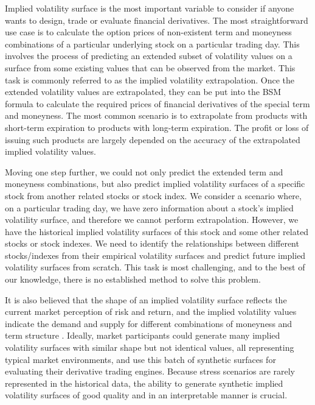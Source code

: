 \documentclass[format=sigconf]{acmart}
\begin{document}
Implied volatility surface is the most important variable to consider if anyone wants to design, trade or evaluate financial derivatives. 
%
The most straightforward use case is to calculate the option prices of non-existent term and moneyness combinations of a particular underlying stock \cite{homescu2011implied} on a particular trading day. This involves the process of predicting an extended subset of volatility values on a surface from some existing values that can be observed from the market. This task is commonly referred to as the implied volatility extrapolation. Once the extended volatility values are extrapolated, they can be put into the BSM formula to calculate the required prices of financial derivatives of the special term and moneyness. The most common scenario is to extrapolate from products with short-term expiration to products with long-term expiration. The profit or loss of issuing such products are largely depended on the accuracy of the extrapolated implied volatility values.

Moving one step further, we could not only predict the extended term and moneyness combinations, but also predict implied volatility surfaces of a specific stock from another related stocks or stock index. We consider a scenario where, on a particular trading day, we have zero information about a stock's implied volatility surface, and therefore we cannot perform extrapolation. However, we have the historical implied volatility surfaces of this stock and some other related stocks or stock indexes. We need to identify the relationships between different stocks/indexes from their empirical volatility surfaces and predict future implied volatility surfaces from scratch. This task is most challenging, and to the best of our knowledge, there is no established method to solve this problem.

It is also believed that the shape of an implied volatility surface reflects the current market perception of risk and return, and the implied volatility values indicate the demand and supply for different combinations of moneyness and term structure \cite{aijo2008implied}. Ideally, market participants could generate many implied volatility surfaces with similar shape but not identical values, all representing typical market environments, and use this batch of synthetic surfaces %
for evaluating their derivative trading engines. Because stress scenarios are rarely represented in the historical data, the ability to generate synthetic implied volatility surfaces of good quality and in an interpretable manner is crucial. 
\end{document}
